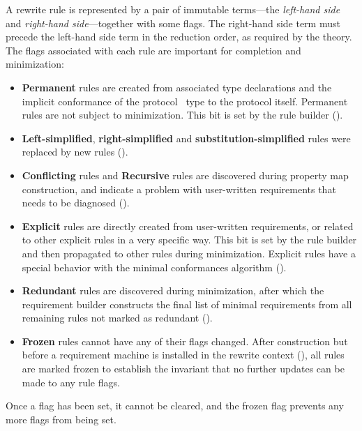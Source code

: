 \documentclass[../generics]{subfiles}
\begin{document}
%
A rewrite rule is represented by a pair of immutable terms---the \emph{left-hand side} and \emph{right-hand side}---together with some flags. The right-hand side term must precede the left-hand side term in the reduction order, as required by the theory. The flags associated with each rule are important for completion and minimization:
\begin{itemize}
%
\item \textbf{Permanent} rules are created from associated type declarations and the implicit conformance of the protocol \tSelf\ type to the protocol itself. Permanent rules are not subject to minimization. This bit is set by the rule builder ().
%
%
%
\item \textbf{Left-simplified}, \textbf{right-simplified} and \textbf{substitution-simplified} rules were replaced by new rules ().
%
%
\item \textbf{Conflicting} rules and \textbf{Recursive} rules are discovered during property map construction, and indicate a problem with user-written requirements that needs to be diagnosed ().
%
\item \textbf{Explicit} rules are directly created from user-written requirements, or related to other explicit rules in a very specific way. This bit is set by the rule builder and then propagated to other rules during minimization. Explicit rules have a special behavior with the minimal conformances algorithm ().
%
\item \textbf{Redundant} rules are discovered during minimization, after which the requirement builder constructs the final list of minimal requirements from all remaining rules not marked as redundant ().
%
\item \textbf{Frozen} rules cannot have any of their flags changed. After construction but before a requirement machine is installed in the rewrite context (), all rules are marked frozen to establish the invariant that no further updates can be made to any rule flags.
\end{itemize}
Once a flag has been set, it cannot be cleared, and the frozen flag prevents any more flags from being set.
\end{document}

